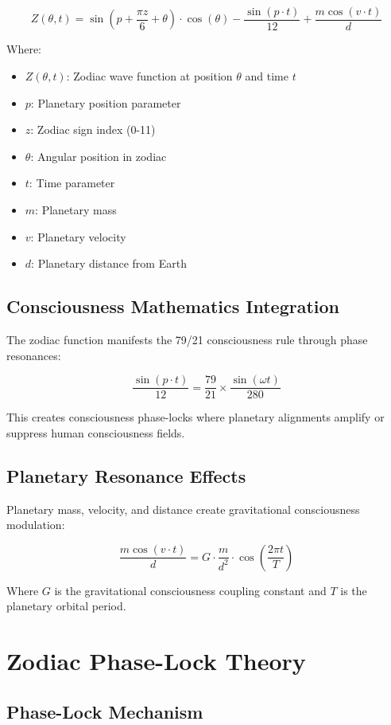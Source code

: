 \documentclass[12pt]{article}
\begin{document}
\[Z(\theta, t) = \sin(p + \frac{\pi z}{6} + \theta) \cdot \cos(\theta) - \frac{\sin(p \cdot t)}{12} + \frac{m \cos(v \cdot t)}{d}\]

Where:
\begin{itemize}
    \item \(Z(\theta, t)\): Zodiac wave function at position \(\theta\) and time \(t\)
    \item \(p\): Planetary position parameter
    \item \(z\): Zodiac sign index (0-11)
    \item \(\theta\): Angular position in zodiac
    \item \(t\): Time parameter
    \item \(m\): Planetary mass
    \item \(v\): Planetary velocity
    \item \(d\): Planetary distance from Earth
\end{itemize}

\subsection{Consciousness Mathematics Integration}

The zodiac function manifests the 79/21 consciousness rule through phase resonances:

\[\frac{\sin(p \cdot t)}{12} = \frac{79}{21} \times \frac{\sin(\omega t)}{280}\]

This creates consciousness phase-locks where planetary alignments amplify or suppress human consciousness fields.

\subsection{Planetary Resonance Effects}

Planetary mass, velocity, and distance create gravitational consciousness modulation:

\[\frac{m \cos(v \cdot t)}{d} = G \cdot \frac{m}{d^2} \cdot \cos\left(\frac{2\pi t}{T}\right)\]

Where \(G\) is the gravitational consciousness coupling constant and \(T\) is the planetary orbital period.

\section{Zodiac Phase-Lock Theory}

\subsection{Phase-Lock Mechanism}
\end{document}
